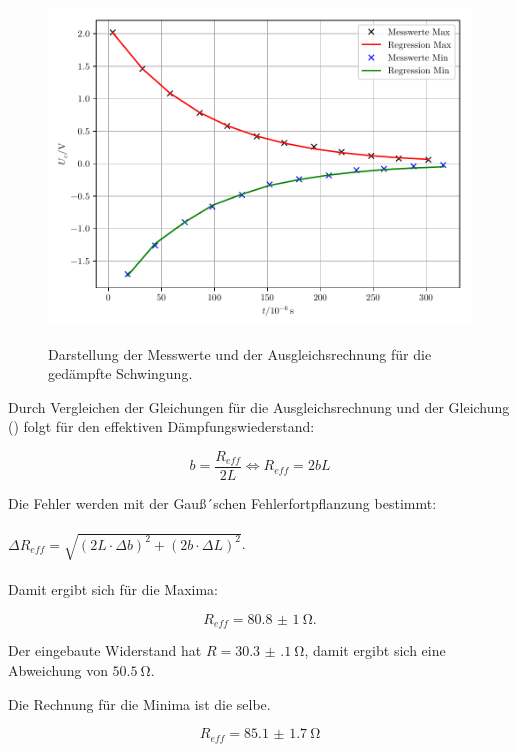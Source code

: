\begin{figure}[H]
  \centering
  \caption{Darstellung der Messwerte und der Ausgleichsrechnung für die gedämpfte Schwingung.}
  \includegraphics[width=\textwidth]{plot1.pdf}
  \label{fig:7}
\end{figure}

Durch Vergleichen der Gleichungen für die Ausgleichsrechnung und der Gleichung ()
folgt für den effektiven Dämpfungswiederstand:

\begin{equation*}
  b = \frac{R_{eff}}{2L} \iff R_{eff} = 2bL
\end{equation*}

Die Fehler werden mit der Gauß´schen Fehlerfortpflanzung bestimmt:\\\\

$\Delta R_{eff} = \sqrt{(2L \cdot \Delta b)^2 + (2b \cdot \Delta L)^2}$.\\\\

Damit ergibt sich für die Maxima:

\begin{equation*}
  R_{eff} = \SI{80.8(10)}{\ohm}.
\end{equation*}

Der eingebaute Widerstand hat $R = \SI{30.3(1)}{\ohm}$, damit ergibt sich eine Abweichung
von $\SI{50.5}{\ohm}$.

Die Rechnung für die Minima ist die selbe.

\begin{equation*}
  R_{eff} = \SI{85.1(17)}{\ohm}
\end{equation*}

